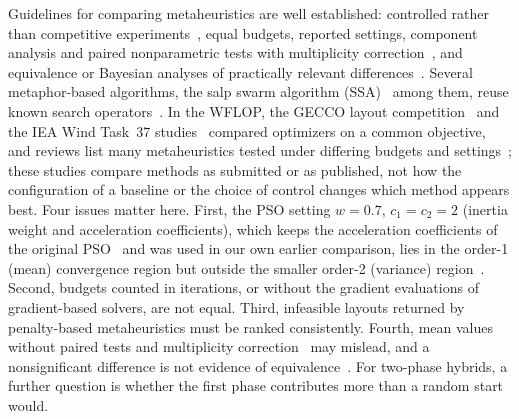 Guidelines for comparing metaheuristics are well established: controlled rather than competitive experiments~\cite{Hooker1995}, equal budgets, reported settings, component analysis and paired nonparametric tests with multiplicity correction~\cite{Demsar2006,Derrac2011,BartzBeielstein2020,LaTorre2021}, and equivalence or Bayesian analyses of practically relevant differences~\cite{Benavoli2017,Lakens2017}. Several metaphor-based algorithms, the salp swarm algorithm (SSA)~\cite{Mirjalili2017} among them, reuse known search operators~\cite{Sorensen2015,CamachoVillalon2023,Castelli2022}. In the WFLOP, the GECCO layout competition~\cite{Wilson2018} and the IEA Wind Task~37 studies~\cite{Baker2019,Thomas2023} compared optimizers on a common objective, and reviews list many metaheuristics tested under differing budgets and settings~\cite{Azlan2021}; these studies compare methods as submitted or as published, not how the configuration of a baseline or the choice of control changes which method appears best. Four issues matter here. First, the PSO setting $w=0.7$, $c_1=c_2=2$ (inertia weight and acceleration coefficients), which keeps the acceleration coefficients of the original PSO~\cite{Kennedy1995} and was used in our own earlier comparison, lies in the order-1 (mean) convergence region but outside the smaller order-2 (variance) region~\cite{Poli2009,Bonyadi2017,Cleghorn2018}. Second, budgets counted in iterations, or without the gradient evaluations of gradient-based solvers, are not equal. Third, infeasible layouts returned by penalty-based metaheuristics must be ranked consistently. Fourth, mean values without paired tests and multiplicity correction~\cite{Benavoli2016} may mislead, and a nonsignificant difference is not evidence of equivalence~\cite{Lakens2017}. For two-phase hybrids, a further question is whether the first phase contributes more than a random start would.

